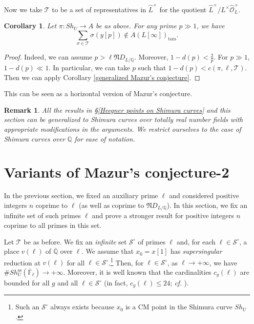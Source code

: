 \documentclass[11pt,oneside,reqno]{amsart}
\newcommand{\ssrm}{\mathrm{ss}}
\newcommand{\F}{\mathbb{F}}
\newcommand{\Q}{\mathbb{Q}}
\newcommand{\Ocal}{\mathcal{O}}
\newcommand{\Scal}{\mathcal{S}}
\newcommand{\Tcal}{\mathcal{T}}
\newcommand{\Nfrak}{\mathfrak{N}}
\theoremstyle{plain}
\newtheorem{corollary}[theorem]{Corollary}
\newtheorem{remark}[theorem]{Remark}
\begin{document}
	
	Now we take $\Tcal$ to be a set of representatives in $\widehat{L}^\times$ for the quotient $\widehat{L}^\times/L^\times\widehat{\Ocal}_L^\times$.	
	\begin{corollary}\label{horizontal Mazur's conjecture}
		Let $\pi\colon Sh_U\to A$ be as above. For any prime $p\gg1$, we have
		\[
		\sum_{\sigma\in\Tcal}\sigma(y[p])\notin A(L[\infty])_\mathrm{tors}.
		\]
	\end{corollary}
	\begin{proof}
		Indeed, we can assume $p>\ell\Nfrak D_{L/\Q}$. Moreover, $1-d(p)<\frac{2}{p}$. For $p\gg1$, $1-d(p)\ll1$. In particular, we can take $p$ such that $1-d(p)<c(\pi,\ell,\Tcal)$. Then we can apply Corollary \ref{generalized Mazur's conjecture}.
	\end{proof}
	This can be seen as a horizontal version of Mazur's conjecture.
	
	
	
	\begin{remark}
		All the results in §\ref{Heegner points on Shimura curves} and this section can be generalized to Shimura curves over totally real number fields with appropriate modifications in the arguments. We restrict ourselves to the case of Shimura curves over $\Q$ for ease of notation.
	\end{remark}
	
	
	
	
	
	
	
	\section{Variants of Mazur's conjecture-2}\label{Mazur's conjecture-2}
	In the previous section, we fixed an auxiliary prime $\ell$ and considered positive integers $n$ coprime to $\ell$ (as well as coprime to $\Nfrak D_{L/\Q}$). In this section, we fix an infinite set of such primes $\ell$ and prove a stronger result for positive integers $n$ coprime to all primes in this set.
	
	
	
	Let $\Tcal$ be as before.
	We fix an \emph{infinite} set $\Scal^\circ$ of primes $\ell$ and, for each $\ell\in\Scal^\circ$, a place $v(\ell)$ of $\overline{\Q}$ over $\ell$. We assume that $x_0=x[1]$ has \emph{supersingular} reduction at $v(\ell)$ for all $\ell\in\Scal^\circ$.\footnote{Such an $\Scal^\circ$ always exists because $x_0$ is a CM point in the Shimura curve $Sh_U$.} Then, for $\ell\in\Scal^\circ$, as $\ell\to +\infty$, we have $\#Sh_U^\ssrm(\overline{\F}_\ell)\to +\infty$. Moreover, it is well known that the cardinalities $c_g(\ell)$ are bounded for all $g$ and all $\ell\in\Scal^\circ$ (in fact, $c_g(\ell)\le 24$; \emph{cf.} \cite[Theorem 11.5.14]{Voight2021}).
	
\end{document}
